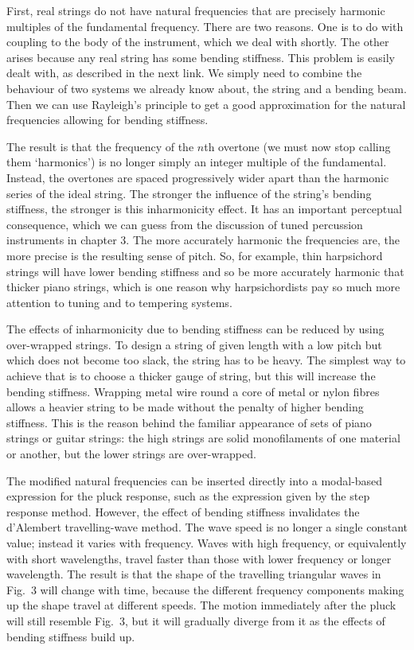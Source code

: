   First, real strings do not have natural frequencies that are precisely 
  harmonic multiples of the fundamental frequency. There are two reasons. One 
  is to do with coupling to the body of the instrument, which we deal with 
  shortly. The other arises because any real string has some bending stiffness. 
  This problem is easily dealt with, as described in the next link. We simply 
  need to combine the behaviour of two systems we already know about, the 
  string and a bending beam. Then we can use Rayleigh's principle to get a good 
  approximation for the natural frequencies allowing for bending stiffness. 

  The result is that the frequency of the $n$th overtone (we must now stop 
  calling them `harmonics') is no longer simply an integer multiple of the 
  fundamental. Instead, the overtones are spaced progressively wider apart than 
  the harmonic series of the ideal string. The stronger the influence of the 
  string's bending stiffness, the stronger is this inharmonicity effect. It has 
  an important perceptual consequence, which we can guess from the discussion 
  of tuned percussion instruments in chapter 3. The more accurately harmonic 
  the frequencies are, the more precise is the resulting sense of pitch. So, 
  for example, thin harpsichord strings will have lower bending stiffness and 
  so be more accurately harmonic that thicker piano strings, which is one 
  reason why harpsichordists pay so much more attention to tuning and to 
  tempering systems. 

  The effects of inharmonicity due to bending stiffness can be reduced by using 
  over-wrapped strings. To design a string of given length with a low pitch but 
  which does not become too slack, the string has to be heavy. The simplest way 
  to achieve that is to choose a thicker gauge of string, but this will 
  increase the bending stiffness. Wrapping metal wire round a core of metal or 
  nylon fibres allows a heavier string to be made without the penalty of higher 
  bending stiffness. This is the reason behind the familiar appearance of sets 
  of piano strings or guitar strings: the high strings are solid monofilaments 
  of one material or another, but the lower strings are over-wrapped. 

  The modified natural frequencies can be inserted directly into a modal-based 
  expression for the pluck response, such as the expression given by the step 
  response method. However, the effect of bending stiffness invalidates the 
  d'Alembert travelling-wave method. The wave speed is no longer a single 
  constant value; instead it varies with frequency. Waves with high frequency, 
  or equivalently with short wavelengths, travel faster than those with lower 
  frequency or longer wavelength. The result is that the shape of the 
  travelling triangular waves in Fig.\ 3 will change with time, because the 
  different frequency components making up the shape travel at different 
  speeds. The motion immediately after the pluck will still resemble Fig.\ 3, 
  but it will gradually diverge from it as the effects of bending stiffness 
  build up. 

